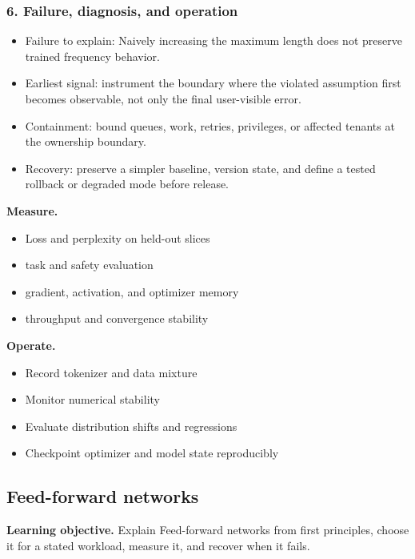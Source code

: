 \subsubsection*{6. Failure, diagnosis, and operation}
\begin{itemize}
\item Failure to explain: Naively increasing the maximum length does not preserve trained frequency behavior.
\item Earliest signal: instrument the boundary where the violated assumption first becomes observable, not only the final user-visible error.
\item Containment: bound queues, work, retries, privileges, or affected tenants at the ownership boundary.
\item Recovery: preserve a simpler baseline, version state, and define a tested rollback or degraded mode before release.
\end{itemize}
\textbf{Measure.}\begin{itemize}
\item Loss and perplexity on held-out slices
\item task and safety evaluation
\item gradient, activation, and optimizer memory
\item throughput and convergence stability
\end{itemize}
\textbf{Operate.}\begin{itemize}
\item Record tokenizer and data mixture
\item Monitor numerical stability
\item Evaluate distribution shifts and regressions
\item Checkpoint optimizer and model state reproducibly
\end{itemize}
\subsection{Feed-forward networks}
\textbf{Learning objective.} Explain Feed-forward networks from first principles, choose it for a stated workload, measure it, and recover when it fails.

